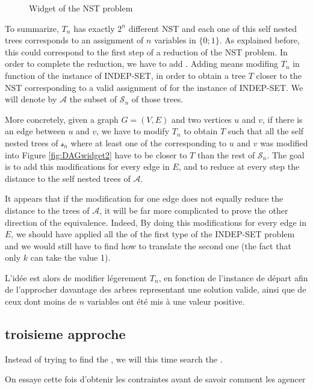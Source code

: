 \begin{figure}
  \centering
  
  \caption{Widget of the NST problem}
  \label{fig:widget}
\end{figure}

To summarize, $T_{n}$ has exactly $2^{n}$ different NST and each one
of this self nested trees corresponds to an assignment of $n$
variables in $\{0;1\}$. As explained before, this could correspond to
the first step of a reduction of the NST problem. In order to complete
the reduction, we have to add \constraints. Adding \constraints means
modifing $T_{n}$ in function of the instance of INDEP-SET, in order to
obtain a tree $T$ closer to the NST corresponding to a valid
assignment of \variables for the instance of INDEP-SET. We will denote
by $\mathcal{A}$ the subset of $\mathcal{S}_{n}$ of those trees.
 
More concretely, given a graph $G=(V,E)$ and two vertices $u$ and $v$,
if there is an edge between $u$ and $v$, we have to modify $T_{n}$ to
obtain $T$ such that all the self nested trees of $\mathcal{s}_{n}$
where at least one of the \widgets corresponding to $u$ and $v$ was
modified into Figure \ref{fig:DAGwidget2} have to be closer to $T$
than the rest of $\mathcal{S}_{n}$. The goal is to add this
modifications for every edge in $E$, and to reduce at every step the
distance to the self nested trees of $\mathcal{A}$. %

It appears that if the modification for one edge does not equally
reduce the distance to the trees of $\mathcal{A}$, it will be far more
complicated to prove the other direction of the equivalence. Indeed, %
By doing this modifications for every edge in $E$,
we should have applied all the \constraints of the first type of the
INDEP-SET problem and we would still have to find how to translate the
second one (the fact that only $k$ \variables can take the value 1).


L'idée est alors de modifier légerement $T_{n}$, en fonction de
l'instance de départ afin de l'approcher davantage des arbres
representant une solution valide, ainsi que de ceux dont moins de $n$
variables ont été mis à une valeur positive. 
\subsection{troisieme approche}
Instead of trying to find the \widgets, we will this time search the
\constraints. 


On essaye cette fois d'obtenir les contraintes avant de savoir comment
les agencer

